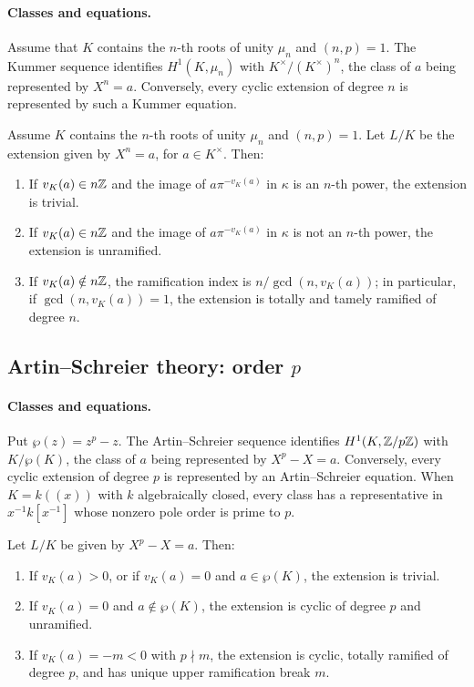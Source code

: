 \paragraph{Classes and equations.}
Assume that $K$ contains the $n$-th roots of unity $\mu_n$ and $(n,p)=1$.
The Kummer sequence identifies
$H^1(K,\mu_n)$ with $K^\times/(K^\times)^n$, the class of $a$ being
represented by $X^n=a$. Conversely, every cyclic extension of degree $n$ is
represented by such a Kummer equation.

\begin{theorem}
\label{theorem:kummer_ramification}
Assume $K$ contains the $n$-th roots of unity $\mu_n$ and $(n,p)=1$.
Let $L/K$ be the extension given by $X^n=a$, for $a\in K^\times$.
Then:
\begin{enumerate}
    \item If $v_K(a)\in n\mathbb{Z}$ and the image of
    $a\pi^{-v_K(a)}$ in $\kappa$ is an $n$-th power, the extension is
    trivial.
    \item If $v_K(a)\in n\mathbb{Z}$ and the image of
    $a\pi^{-v_K(a)}$ in $\kappa$ is not an $n$-th power, the extension is
    unramified.
    \item If $v_K(a)\notin n\mathbb{Z}$, the ramification index is
    $n/\gcd(n,v_K(a))$; in particular, if $\gcd(n,v_K(a))=1$, the extension
    is totally and tamely ramified of degree $n$.
\end{enumerate}
\end{theorem}

\subsection{Artin--Schreier theory: order \texorpdfstring{$p$}{p}}

\paragraph{Classes and equations.}
Put $\wp(z)=z^p-z$. The Artin--Schreier sequence identifies
$H^1(K,\mathbb{Z}/p\mathbb{Z})$ with $K/\wp(K)$, the class of $a$ being represented by
$X^p-X=a$. Conversely, every cyclic extension of degree $p$ is represented
by an Artin--Schreier equation. When $K=k((x))$ with $k$ algebraically
closed, every class has a representative in $x^{-1}k[x^{-1}]$ whose nonzero
pole order is prime to $p$.

\begin{theorem}
\label{theorem:artin_schreier_ramification}
Let $L/K$ be given by $X^p-X=a$. Then:
\begin{enumerate}
    \item If $v_K(a)>0$, or if $v_K(a)=0$ and $a\in\wp(K)$, the extension
    is trivial.
    \item If $v_K(a)=0$ and $a\notin\wp(K)$, the extension is cyclic of
    degree $p$ and unramified.
    \item If $v_K(a)=-m<0$ with $p\nmid m$, the extension is cyclic,
    totally ramified of degree $p$, and has unique upper ramification break
    $m$.
\end{enumerate}
\end{theorem}


